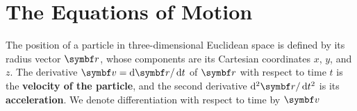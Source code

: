 



\section{The Equations of Motion}

The position of a particle in three-dimensional Euclidean space is defined by
its radius vector \(\vct{r}\), whose components are its Cartesian coordinates
\(x\), \(y\), and \(z\). The derivative \(\vct{v} = \diff \vct{r} / \diff t\)
of \(\vct{r}\) with respect to time \(t\) is the {\bf velocity of the
particle}, and the second derivative \(\diff^2 \vct{r} / \diff t^2\) is its
\textbf{acceleration}. We denote differentiation with respect to time by
\(\vct{v}\)

\Edc
